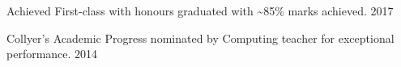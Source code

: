 
\begin{cvhonors}


  \cvhonor
    {Achieved First-class with honours} %
    {graduated with \textasciitilde{}85\% marks achieved.} %
    {2017} %

  \cvhonor
    {Collyer's Academic Progress} %
    {nominated by Computing teacher for exceptional performance.} %
    {2014} %

\end{cvhonors}

